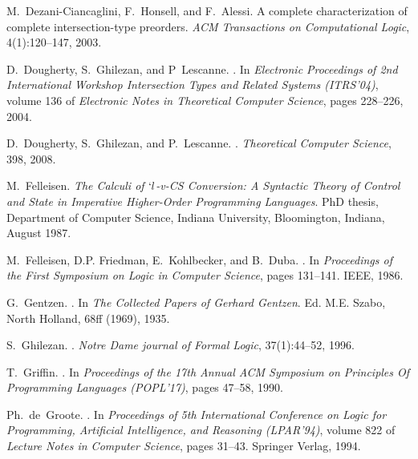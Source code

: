 \documentclass{lmcs}
\begin{document}
\begin{thebibliography}{10}
M.~Dezani-Ciancaglini, F.~Honsell, and F.~Alessi.
\newblock A complete characterization of complete intersection-type preorders.
\newblock \emph{ACM Transactions on Computational Logic}, 4(1):120--147, 2003.

D.~Dougherty, S.~Ghilezan, and P~Lescanne.
.
\newblock In \emph{Electronic Proceedings of 2nd International Workshop {\em
 Intersection Types and Related Systems} (ITRS'04)}, volume 136 of {\em
 Electronic Notes in Theoretical Computer Science}, pages 228--226, 2004.

D.~Dougherty, S.~Ghilezan, and P.~Lescanne.
.
\newblock \emph{Theoretical Computer Science}, 398, 2008.

M.~Felleisen.
\newblock \emph{{The Calculi of $`l$-v-CS Conversion: A Syntactic Theory of
 Control and State in Imperative Higher-Order Programming Languages}}.
\newblock PhD thesis, Department of Computer Science, Indiana University,
 Bloomington, Indiana, August 1987.

M.~Felleisen, D.P. Friedman, E.~Kohlbecker, and B.~Duba.
.
\newblock In \emph{Proceedings of the First Symposium on Logic in Computer
 Science}, pages 131--141. IEEE, 1986.

G.~Gentzen.
.
\newblock In \emph{The Collected Papers of Gerhard Gentzen}. Ed. M.E. Szabo,
 North Holland, 68ff (1969), 1935.

S.~Ghilezan.
.
\newblock \emph{Notre Dame journal of Formal Logic}, 37(1):44--52, 1996.

T.~Griffin.
.
\newblock In \emph{Proceedings of the 17th Annual {ACM} Symposium on Principles
 Of Programming Languages (POPL'17)}, pages 47--58, 1990.

Ph.~de~Groote.
.
\newblock In \emph{Proceedings of 5th International Conference on Logic for
 Programming, Artificial Intelligence, and Reasoning (LPAR'94)}, volume 822 of
 \emph{Lecture Notes in Computer Science}, pages 31--43. Springer Verlag, 1994.


\end{thebibliography}
\end{document}
